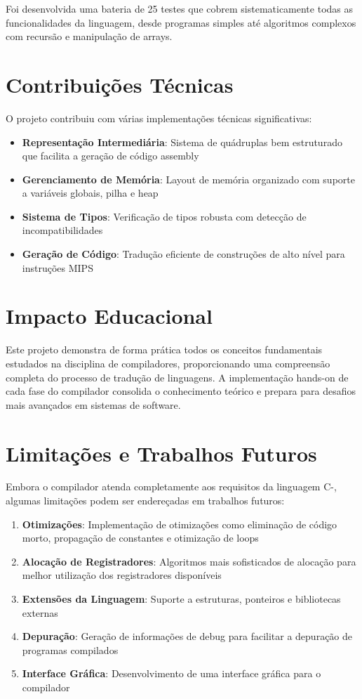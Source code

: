 \documentclass[
	12pt,				%
	oneside,
	a4paper,			%
	english,			%
	french,				%
	spanish,			%
	brazil,				%
	]{abntex2}
\begin{document}
Foi desenvolvida uma bateria de 25 testes que cobrem sistematicamente todas as funcionalidades da linguagem, desde programas simples até algoritmos complexos com recursão e manipulação de arrays.

\section{Contribuições Técnicas}

O projeto contribuiu com várias implementações técnicas significativas:

\begin{itemize}
    \item \textbf{Representação Intermediária}: Sistema de quádruplas bem estruturado que facilita a geração de código assembly
    \item \textbf{Gerenciamento de Memória}: Layout de memória organizado com suporte a variáveis globais, pilha e heap
    \item \textbf{Sistema de Tipos}: Verificação de tipos robusta com detecção de incompatibilidades
    \item \textbf{Geração de Código}: Tradução eficiente de construções de alto nível para instruções MIPS
\end{itemize}

\section{Impacto Educacional}

Este projeto demonstra de forma prática todos os conceitos fundamentais estudados na disciplina de compiladores, proporcionando uma compreensão completa do processo de tradução de linguagens. A implementação hands-on de cada fase do compilador consolida o conhecimento teórico e prepara para desafios mais avançados em sistemas de software.

\section{Limitações e Trabalhos Futuros}

Embora o compilador atenda completamente aos requisitos da linguagem C-, algumas limitações podem ser endereçadas em trabalhos futuros:

\begin{enumerate}
    \item \textbf{Otimizações}: Implementação de otimizações como eliminação de código morto, propagação de constantes e otimização de loops
    \item \textbf{Alocação de Registradores}: Algoritmos mais sofisticados de alocação para melhor utilização dos registradores disponíveis
    \item \textbf{Extensões da Linguagem}: Suporte a estruturas, ponteiros e bibliotecas externas
    \item \textbf{Depuração}: Geração de informações de debug para facilitar a depuração de programas compilados
    \item \textbf{Interface Gráfica}: Desenvolvimento de uma interface gráfica para o compilador
\end{enumerate}
\end{document}

